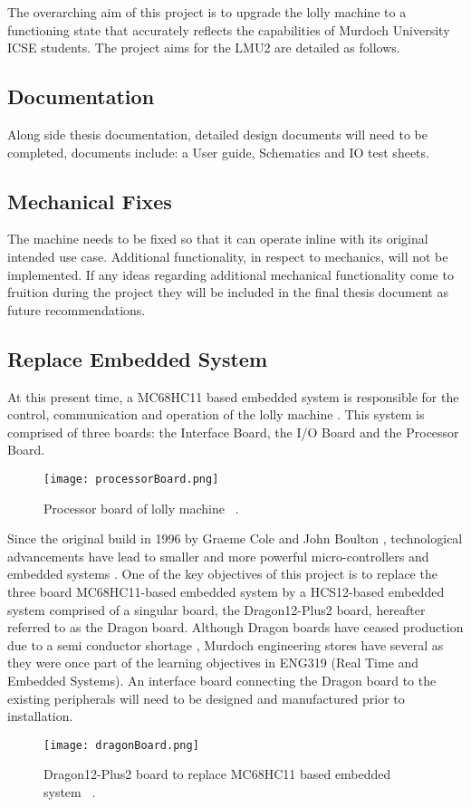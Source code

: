 The overarching aim of this project is to upgrade the lolly machine to a functioning state that accurately reflects the capabilities of Murdoch University ICSE students.
The project aims for the LMU2 are detailed as follows.

\subsection{Documentation}
    Along side thesis documentation, detailed design documents will need to be completed, documents include: a User guide, Schematics and IO test sheets.

\subsection{Mechanical Fixes}
    The machine needs to be fixed so that it can operate inline with its original intended use case. Additional functionality, in respect to mechanics,  will not be implemented. If any ideas regarding additional mechanical functionality come to fruition during the project they will be included in the final thesis document as future recommendations.
    
\subsection{Replace Embedded System}
    At this present time, a MC68HC11 based embedded system is responsible for the control, communication and operation of the lolly machine \cite{thesisJodie}. This system is comprised of three boards: the Interface Board, the I/O Board and the Processor Board.\\
    \begin{figure}[ht]
        \centering
        \texttt{[image: processorBoard.png]}
        \caption{Processor board of lolly machine ~\cite{thesisJodie}.}
        \label{fig:processorBoard}
    \end{figure}
    Since the original build in 1996 by Graeme Cole and John Boulton \cite{computerControlGCole}, technological advancements have lead to smaller and more powerful micro-controllers and embedded systems \cite{mCHistory}. One of the key objectives of this project is to replace the three board MC68HC11-based embedded system by a HCS12-based embedded system comprised of a singular board, the Dragon12-Plus2 board, hereafter referred to as the Dragon board. 
    Although Dragon boards have ceased production due to a semi conductor shortage \cite{dragonBoardRevD}, Murdoch engineering stores have several as they were once part of the learning objectives in ENG319 (Real Time and Embedded Systems). An interface board connecting the Dragon board to the existing peripherals will need to be designed and manufactured prior to installation.\\
    \begin{figure}[ht]
        \centering
        \texttt{[image: dragonBoard.png]}
        \caption{Dragon12-Plus2 board to replace MC68HC11 based embedded system ~\cite{dragonBoard}.}
        \label{fig:dragonBoard}
    \end{figure}
    
